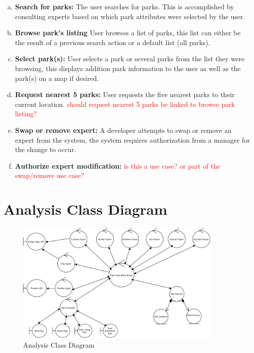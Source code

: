 \documentclass[titlepage,12pt]{article}
\begin{document}
\begin{enumerate}[a)]
    \item \textbf{Search for parks:} The user searches for parks. This is accomplished by consulting
    experts based on which park attributes were selected by the user.
    \item \textbf{Browse park's listing} User browses a list of parks, this list can either be the
    result of a previous search action or a default list (all parks).
    \item \textbf{Select park(s):} User selects a park or several parks from the list they were
    browsing, this displays addition park information to the user as well as the park(s) on a map if
    desired.
    \item \textbf{Request nearest 5 parks:} User requests the five nearest parks to their current
    location. \textcolor{red}{should request nearest 5 parks be linked to browse park listing?}
    \item \textbf{Swap or remove expert:} A developer attempts to swap or remove an expert from the
    system, the system requires authorization from a manager for the change to occur.
    \item \textbf{Authorize expert modification:} \textcolor{red}{is this a use case? or part of the
    swap/remove use case?}
\end{enumerate}


\section{Analysis Class Diagram}
\label{sec:analysis_class_diagram}
\begin{figure}[htbp]
	\centerline{\includegraphics[width=0.9\textwidth]{images//analysis_class_diagram}}
	\caption{Analysis Class Diagram}
	\label{analysisClassDiagram}
\end{figure}
\end{document}
